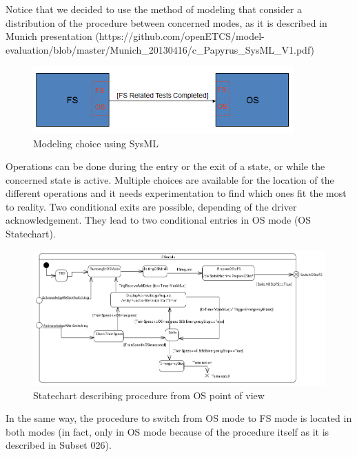 \documentclass{template/openetcs_article}
\begin{document}
\newpage

Notice that we decided to use the method of modeling that consider a distribution of the procedure between concerned modes, as it is described in Munich presentation (https://github.com/openETCS/model-evaluation/blob/master/Munich\_20130416/c\_Papyrus\_SysML\_V1.pdf)


\begin{figure}[h]
  \centering
  \includegraphics[width=10cm]{fig9_modeling_choice.png}
  \caption{Modeling choice using SysML}
  \label{fig: Modeling choice using SysML}
\end{figure}

Operations can be done during the entry or the exit of a state, or while the concerned state is active. Multiple choices are available for the location of the different operations and it needs experimentation to find which ones fit the most to reality.
Two conditional exits are possible, depending of the driver acknowledgement. They lead to two conditional entries in OS mode (OS Statechart).

\newpage

\begin{figure}[h]
  \centering
  \includegraphics[width=14cm]{fig10_statechart_procedure_OS.png}
  \caption{Statechart describing procedure from OS point of view}
  \label{fig: Statechart describing procedure from OS point of view}
\end{figure}

In the same way, the procedure to switch from OS mode to FS mode is located in both modes (in fact, only in OS mode because of the procedure itself as it is described in Subset 026).
\end{document}
